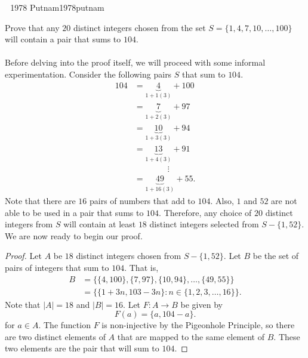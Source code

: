         \begin{example}{\Difficulty\,\Difficulty\,\Difficulty\,\,1978 Putnam}{1978putnam}
        
            Prove that any \(20\) distinct integers chosen from the set \(S=\{1,4,7,10,\ldots,100\}\) will contain a pair that sums to \(104\).
            \\
            \\
            Before delving into the proof itself, we will proceed with some informal experimentation. Consider the following pairs \(S\) that sum to \(104\).
            \begin{align*}
                104&=\underbrace{4}_{1+1(3)}+100 \\
                &=\underbrace{7}_{1+2(3)}+97 \\
                &=\underbrace{10}_{1+3(3)}+94 \\
                &=\underbrace{13}_{1+4(3)}+91 \\
                &\qquad\qquad\vdots \\
                &=\underbrace{49}_{1+16(3)}+55.
            \end{align*}
            Note that there are \(16\) pairs of numbers that add to \(104\). Also, \(1\) and \(52\) are not able to be used in a pair that sums to \(104\). Therefore, any choice of \(20\) distinct integers from \(S\) will contain at least \(18\) distinct integers selected from \(S-\{1,52\}\). We are now ready to begin our proof.
            \begin{proof}
                Let \(A\) be \(18\) distinct integers chosen from \(S-\{1,52\}\). Let \(B\) be the set of pairs of integers that sum to \(104\). That is,
                \begin{align*}
                    B&=\{\{4,100\},\{7,97\},\{10,94\},\ldots,\{49,55\}\} \\
                    &=\{\{1+3n, 103-3n\}:n\in\{1,2,3,\ldots,16\}\}.
                \end{align*}
                Note that \(|A|=18\) and \(|B|=16\). Let \(F:A\to B\) be given by 
                \begin{equation*}
                    F(a)=\{a,104-a\}.
                \end{equation*}
                for \(a\in A\). The function \(F\) is non-injective by the Pigeonhole Principle, so there are two distinct elements of \(A\) that are mapped to the same element of \(B\). These two elements are the pair that will sum to \(104\).
            \end{proof}
        
        \end{example}
